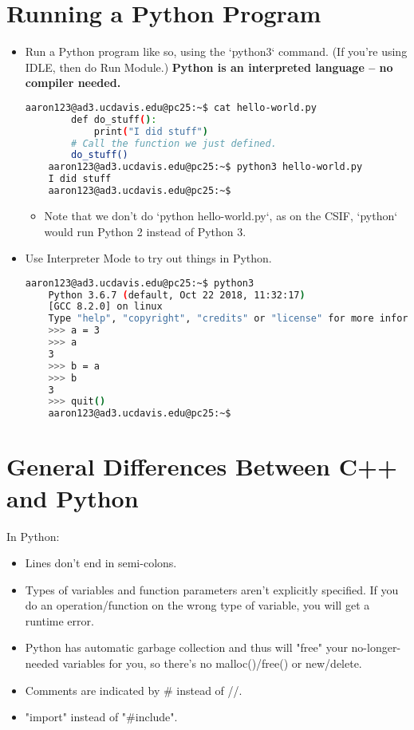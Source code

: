 \documentclass{article}
\begin{document}
\section{Running a Python Program}
\begin{itemize}
    \item Run a Python program like so, using the `python3` command. (If you're using IDLE, then do Run Module.) \textbf{Python is an interpreted language -- no compiler needed.}
    \begin{lstlisting}[language=bash]
    aaron123@ad3.ucdavis.edu@pc25:~$ cat hello-world.py 
        def do_stuff():
            print("I did stuff")
        # Call the function we just defined.
        do_stuff()
    aaron123@ad3.ucdavis.edu@pc25:~$ python3 hello-world.py 
    I did stuff
    aaron123@ad3.ucdavis.edu@pc25:~$ 
    \end{lstlisting}
    \begin{itemize}
        \item Note that we don't do `python hello-world.py`, as on the CSIF, `python` would run Python 2 instead of Python 3.
    \end{itemize}
    \item Use Interpreter Mode to try out things in Python.
    \begin{lstlisting}[language=bash]
    aaron123@ad3.ucdavis.edu@pc25:~$ python3
    Python 3.6.7 (default, Oct 22 2018, 11:32:17) 
    [GCC 8.2.0] on linux
    Type "help", "copyright", "credits" or "license" for more information.
    >>> a = 3
    >>> a
    3
    >>> b = a
    >>> b
    3
    >>> quit()
    aaron123@ad3.ucdavis.edu@pc25:~$ 
    \end{lstlisting}
\end{itemize}

\section{General Differences Between C++ and Python}
In Python:
\begin{itemize}
    \item Lines don't end in semi-colons.
    \item Types of variables and function parameters aren't explicitly specified. If you do an operation/function on the wrong type of variable, you will get a runtime error.
    \item Python has automatic garbage collection and thus will "free" your no-longer-needed variables for you, so there's no malloc()/free() or new/delete.
    \item Comments are indicated by \# instead of //.
    \item "import" instead of "\#include".
\end{itemize}
\end{document}
